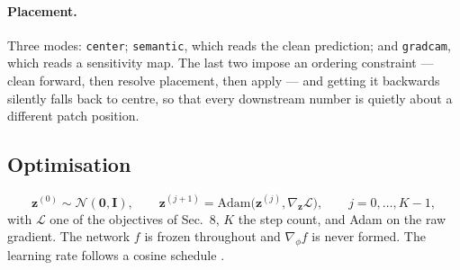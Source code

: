 \documentclass[11pt,a4paper]{article}
\begin{document}
\paragraph{Placement.}
Three modes: \texttt{center}; \texttt{semantic}, which reads the clean
prediction; and \texttt{gradcam}, which reads a sensitivity map. The last
two impose an ordering constraint --- clean forward, then resolve placement,
then apply --- and getting it backwards silently falls back to centre, so
that every downstream number is quietly about a different patch position.

\subsection{Optimisation}

\begin{equation}
  \mathbf{z}^{(0)}\sim\mathcal{N}(\mathbf{0},\mathbf{I}),\qquad
  \mathbf{z}^{(j+1)} = \mathrm{Adam}\big(\mathbf{z}^{(j)},
     \nabla_{\mathbf{z}}\mathcal{L}\big),\qquad j=0,\dots,K-1,
  \label{eq:opt}
\end{equation}
with $\mathcal{L}$ one of the objectives of Sec.~8, $K$ the step count, and
Adam \citep{kingma2015adam} on the raw gradient. The network $f$ is frozen
throughout and $\nabla_\phi f$ is never formed. The learning rate follows a
cosine schedule \citep{loshchilov2017sgdr}.
\end{document}
